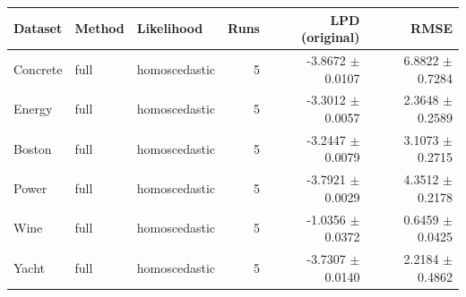 \begin{tabular}{lllrrr}
\toprule
Dataset & Method & Likelihood & Runs & LPD (original) & RMSE \\
\midrule
Concrete & full & homoscedastic & 5 & -3.8672 $\pm$ 0.0107 & 6.8822 $\pm$ 0.7284 \\
Energy & full & homoscedastic & 5 & -3.3012 $\pm$ 0.0057 & 2.3648 $\pm$ 0.2589 \\
Boston & full & homoscedastic & 5 & -3.2447 $\pm$ 0.0079 & 3.1073 $\pm$ 0.2715 \\
Power & full & homoscedastic & 5 & -3.7921 $\pm$ 0.0029 & 4.3512 $\pm$ 0.2178 \\
Wine & full & homoscedastic & 5 & -1.0356 $\pm$ 0.0372 & 0.6459 $\pm$ 0.0425 \\
Yacht & full & homoscedastic & 5 & -3.7307 $\pm$ 0.0140 & 2.2184 $\pm$ 0.4862 \\
\bottomrule
\end{tabular}
